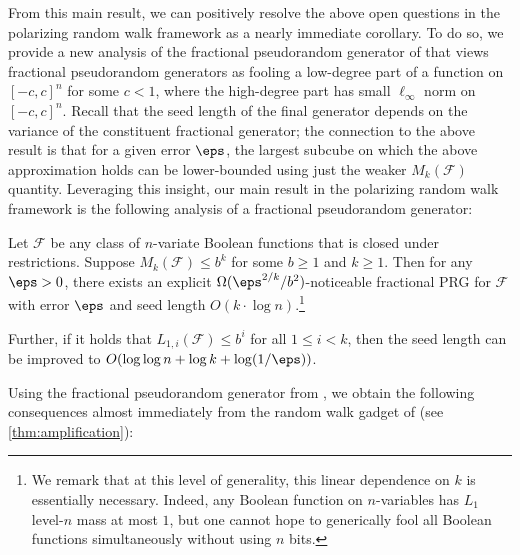 {From this main result, we can positively resolve the above open questions in the polarizing random walk framework as a nearly immediate corollary. To do so, we provide a new analysis of the fractional pseudorandom generator of \cite{CHHL} that views fractional pseudorandom generators as fooling a low-degree part of a function on $[-c,c]^n$ for some $c<1$, where the high-degree part has small $\ell_{\infty}$ norm on $[-c,c]^n$. Recall that the seed length of the final generator depends on the variance of the constituent fractional generator; the connection to the above result is that for a given error $\eps$, the largest subcube on which the above approximation holds can be lower-bounded using just the weaker $M_k(\mathcal{F})$ quantity.}
Leveraging this insight, our main result in the polarizing random walk framework is the following analysis of a fractional pseudorandom generator:
\begin{THM}
\label{thm:fracprg1}
Let $\mathcal{F}$ be any class of $n$-variate Boolean functions that is closed under restrictions.  Suppose $M_k(\mathcal{F})\leq b^{k}$ for some $b\geq 1$ and  $k \geq 1$. Then for any $\eps>0$, there exists an explicit $\Omega(\eps^{2/k}/b^2)$-noticeable fractional PRG for $\mathcal{F}$ with error $\eps$ and seed length $O(k\cdot \log n)$.\footnote{We remark that at this level of generality, this linear dependence on $k$ is essentially necessary. Indeed, any Boolean function on $n$-variables has $L_1$ level-$n$ mass at most $1$, but one cannot hope to generically fool all Boolean functions simultaneously without using $n$ bits.}

Further, if it holds that $L_{1,i}(\mathcal{F})\leq b^{i}$ for all $1\leq i<k$, then the seed length can be improved to $O(\log\log n + \log k+\log(1/\eps))$.
\end{THM}

Using the fractional pseudorandom generator from , we obtain the following consequences almost immediately from the random walk gadget of \cite{CHHL} (see \cref{thm:amplification}):

